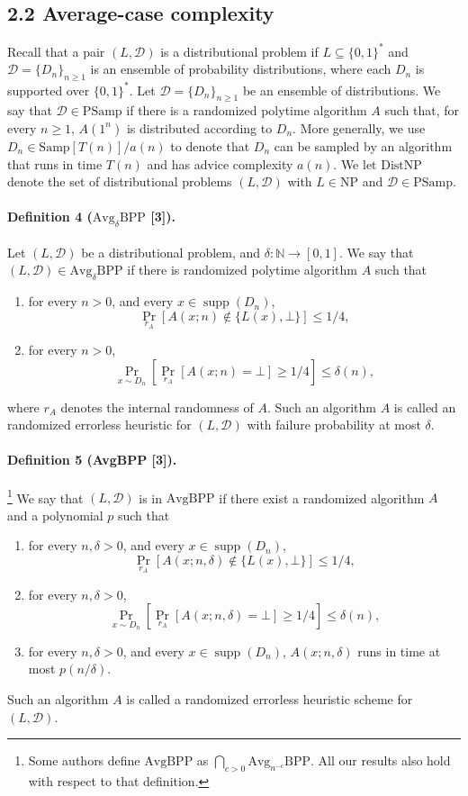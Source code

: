 \documentclass[10pt,a4paper]{article}
\begin{document}
\subsection*{2.2 Average-case complexity}
Recall that a pair $(L,\mathcal D)$ is a distributional problem if $L\subseteq\{0,1\}^*$ and $\mathcal D=\{D_n\}_{n\geq1}$ is an ensemble of probability distributions, where each $D_n$ is supported over $\{0,1\}^*$.
Let $\mathcal D=\{D_n\}_{n\geq1}$ be an ensemble of distributions. We say that $\mathcal D\in\mathrm{PSamp}$ if there is a randomized polytime algorithm $A$ such that, for every $n\geq1$, $A(1^n)$ is distributed according to $D_n$. More generally, we use $D_n\in\mathrm{Samp}[T(n)]/a(n)$ to denote that $D_n$ can be sampled by an algorithm that runs in time $T(n)$ and has advice complexity $a(n)$.
We let $\mathrm{DistNP}$ denote the set of distributional problems $(L,\mathcal D)$ with $L\in\mathrm{NP}$ and $\mathcal D\in\mathrm{PSamp}$.
\paragraph{Definition 4 ($\mathrm{Avg}_\delta\mathrm{BPP}$ [3]).} Let $(L,\mathcal D)$ be a distributional problem, and $\delta:\mathbb N\to[0,1]$. We say that $(L,\mathcal D)\in\mathrm{Avg}_\delta\mathrm{BPP}$ if there is randomized polytime algorithm $A$ such that
\begin{enumerate}
\item for every $n>0$, and every $x\in\operatorname{supp}(D_n)$,
\[\Pr_{r_A}[A(x;n)\notin\{L(x),\bot\}]\leq1/4,\]
\item for every $n>0$,
\[\Pr_{x\sim D_n}\left[\Pr_{r_A}[A(x;n)=\bot]\geq1/4\right]\leq\delta(n),\]
\end{enumerate}
where $r_A$ denotes the internal randomness of $A$. Such an algorithm $A$ is called an randomized errorless heuristic for $(L,\mathcal D)$ with failure probability at most $\delta$.
\paragraph{Definition 5 (AvgBPP [3]).}\footnote{Some authors define $\mathrm{AvgBPP}$ as $\bigcap_{c>0}\mathrm{Avg}_{n^{-c}}\mathrm{BPP}$. All our results also hold with respect to that definition.} We say that $(L,\mathcal D)$ is in $\mathrm{AvgBPP}$ if there exist a randomized algorithm $A$ and a polynomial $p$ such that
\begin{enumerate}
\item for every $n,\delta>0$, and every $x\in\operatorname{supp}(D_n)$,
\[\Pr_{r_A}[A(x;n,\delta)\notin\{L(x),\bot\}]\leq1/4,\]
\item for every $n,\delta>0$,
\[\Pr_{x\sim D_n}\left[\Pr_{r_A}[A(x;n,\delta)=\bot]\geq1/4\right]\leq\delta(n),\]
\item for every $n,\delta>0$, and every $x\in\operatorname{supp}(D_n)$, $A(x;n,\delta)$ runs in time at most $p(n/\delta)$.
\end{enumerate}
Such an algorithm $A$ is called a randomized errorless heuristic scheme for $(L,\mathcal D)$.
\end{document}
